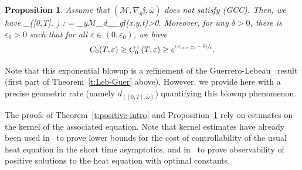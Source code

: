 \documentclass[10pt]{amsart}
\newcommand{\pGCC}{\textup{(GCC)}\xspace}
\newcommand{\psfrac}[2]{\sfrac{(#1)}{#2}}
\newtheorem{proposition}[lemma]{Proposition}
\theoremstyle{definition}
\newcommand{\M}{\ensuremath{\mathcal M}}
\newcommand{\f}{\ensuremath{\mathfrak{f}}}
\def\bal#1\nal{\begin{align*}#1\end{align*}}
\let\e\varepsilon
\let\eps\varepsilon
\begin{document}
\begin{proposition}
\label{proplowerobse+}
Assume that $(\M,\nabla_g \f,\overline{\omega})$ does not satisfy \pGCC. Then, we have
\bal
d_{([0,T], \overline{\omega})} : = \sup_{y\in \M}\inf_{}d_{\nabla_g\f}(x,y,t)>0.
\nal
Moreover, for any $\delta>0$, there is $\e_0>0$ such that for all $\eps \in (0,\eps_0)$, we have
\begin{equation}
C_{0}(T,\e)\geq C_{0}^{+}(T,\e)\geq e^{\psfrac{d_{([0,T], \overline{\omega})}-\delta}{\e}}\label{lowercost+}.
\end{equation}
\end{proposition}
Note that this exponential blowup is a refinement of the Guerrero-Lebeau~\cite{GL:07} result (first part of Theorem~\ref{t:Leb-Guer} above). However, we provide here with a precise geometric rate (namely $d_{([0,T], \overline{\omega})}$) quantifying this blowup phenomenon.

The proofs of Theorem~\ref{t:positive-intro} and Proposition~\ref{proplowerobse+} rely on estimates on the kernel of the associated equation. Note that kernel estimates have already been used in~\cite{Miller:04} to prove lower bounds for the cost of controllability of the usual heat equation in the short time asymptotics, and in~\cite{LL:18} to prove observability of positive solutions to the heat equation with optimal constants.
\end{document}

